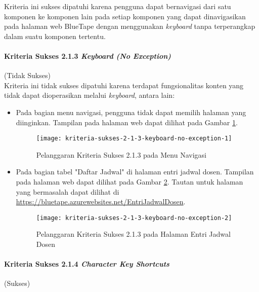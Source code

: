 Kriteria ini sukses dipatuhi karena pengguna dapat bernavigasi dari satu komponen ke komponen lain pada setiap komponen yang dapat dinavigasikan pada halaman web BlueTape dengan menggunakan \textit{keyboard} tanpa terperangkap dalam suatu komponen tertentu.

\paragraph{Kriteria Sukses 2.1.3 \textit{Keyboard (No Exception)}}
\label{par:kepatuhan_bluetape_kriteria_sukses_2.1.3}
(Tidak Sukses)\\

Kriteria ini tidak sukses dipatuhi karena terdapat fungsionalitas konten yang tidak dapat dioperasikan melalui \textit{keyboard}, antara lain:

\begin{itemize}
    \item Pada bagian menu navigasi, pengguna tidak dapat memilih halaman yang diinginkan. Tampilan pada halaman web dapat dilihat pada Gambar \ref{fig:2.1.3_keyboard_no_exception_1}.
    \begin{figure}[H]
        \centering  
        \texttt{[image: kriteria-sukses-2-1-3-keyboard-no-exception-1]}  
        \caption[Pelanggaran Kriteria Sukses 2.1.3 pada Menu Navigasi]{Pelanggaran Kriteria Sukses 2.1.3 pada Menu Navigasi}
        \label{fig:2.1.3_keyboard_no_exception_1}  
    \end{figure} 

    \item Pada bagian tabel "Daftar Jadwal" di halaman entri jadwal dosen. Tampilan pada halaman web dapat dilihat pada Gambar \ref{fig:2.1.3_keyboard_no_exception_2}. Tautan untuk halaman yang bermasalah dapat dilihat di \url{https://bluetape.azurewebsites.net/EntriJadwalDosen}.
    \begin{figure}[H]
        \centering  
        \texttt{[image: kriteria-sukses-2-1-3-keyboard-no-exception-2]}  
        \caption[Pelanggaran Kriteria Sukses 2.1.3 pada Halaman Entri Jadwal Dosen]{Pelanggaran Kriteria Sukses 2.1.3 pada Halaman Entri Jadwal Dosen}
        \label{fig:2.1.3_keyboard_no_exception_2}  
    \end{figure} 
\end{itemize}

\paragraph{Kriteria Sukses 2.1.4 \textit{Character Key Shortcuts}}
\label{par:kepatuhan_bluetape_kriteria_sukses_2.1.4}
(Sukses)\\

